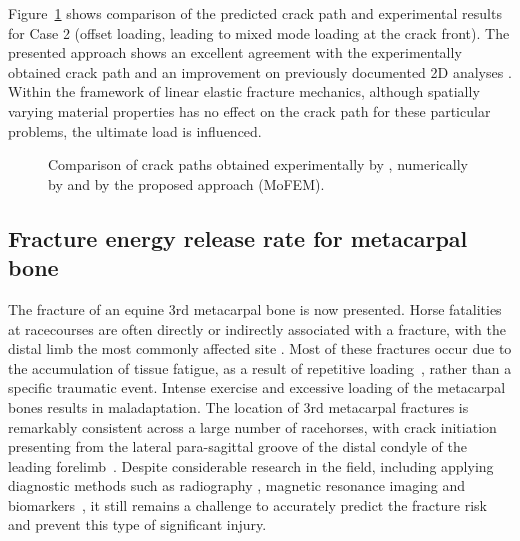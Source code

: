 \documentclass[onecolumn]{svjour3}
\begin{document}
Figure~\ref{fig:fgm_crack_path_comapre} shows comparison of the predicted crack path and experimental results for Case 2 (offset loading, leading to mixed mode loading at the crack front). The presented approach shows an excellent agreement with the experimentally obtained crack path and an improvement on previously documented 2D analyses \cite{kim2004simulation}. 
Within the framework of linear elastic fracture mechanics, although spatially varying material properties has no effect on the crack path for these particular problems, the ultimate load is influenced.
% 
\begin{figure}
		\centering
		\caption{Comparison of crack paths obtained experimentally by \cite{galvez1996crack}, numerically by \citep{kim2004simulation} and by the proposed approach (MoFEM).}
		\label{fig:fgm_crack_path_comapre}
\end{figure}
% 
% 
\subsection{Fracture energy release rate for metacarpal bone} 
\label{sec:mc3_release_eng}
% 
The fracture of an equine 3rd metacarpal bone is now presented.
Horse fatalities at racecourses are often directly or indirectly associated with a fracture, with the distal limb the most commonly affected site \cite{parkin2004risk}.
Most of these fractures occur due to the accumulation of tissue fatigue, as a result of repetitive loading~\cite{Parkin2005}, rather than a specific traumatic event. 
Intense exercise and excessive loading of the metacarpal bones results in maladaptation. 
The location of 3rd metacarpal fractures is remarkably consistent across a large number of racehorses,  with crack initiation presenting from 
the lateral para-sagittal groove of the distal condyle of the leading forelimb~\cite{jacklin2012frequency, parkin2006analysis}.
Despite considerable research in the field, including applying diagnostic methods such as radiography 
\cite{bogers2016quantitative, crijns2014intramodality, loughridge2017qualitative}, magnetic resonance imaging 
\cite{tranquille2017MRI} and biomarkers~\cite{mcilwraith2005use}, it still remains a challenge to accurately predict the fracture risk and prevent this type of significant injury.
\end{document}
